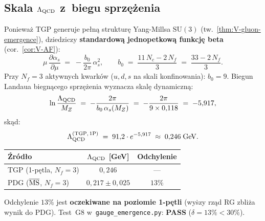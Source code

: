 \subsection{Skala $\Lambda_{\rm QCD}$ z~biegu sprz\k{e}\.zenia}%
\label{app:V-LambdaQCD}

\begin{proposition}%
\label{prop:V-LambdaQCD-RG}
Poniewa\.z TGP generuje pe\l{}n\k{a} struktur\k{e} Yang-Millsa
$\mathrm{SU}(3)$ (tw.~\ref{thm:V-gluon-emergence}), dziedziczy
\textbf{standardow\k{a} jednopetkow\k{a} funkcj\k{e} beta}
(cor.~\ref{cor:V-AF}):
\begin{equation}
  \mu\,\frac{\partial\alpha_s}{\partial\mu}
  \;=\; -\frac{b_0}{2\pi}\,\alpha_s^2,
  \qquad
  b_0 \;=\; \frac{11\,N_c - 2\,N_f}{3}
  \;=\; \frac{33 - 2\,N_f}{3}.
\end{equation}
Przy $N_f = 3$ aktywnych kwark\'ow ($u,d,s$ na skali konfinowania):
$b_0 = 9$.
Biegun Landaua biegn\k{a}cego sprz\k{e}\.zenia wyznacza skal\k{e}
dynamiczn\k{a}:
\begin{equation}\label{eq:V-LambdaQCD}
  \ln\frac{\Lambda_{\rm QCD}}{M_Z}
  \;=\; -\frac{2\pi}{b_0\,\alpha_s(M_Z)}
  \;=\; -\frac{2\pi}{9\times 0{,}118}
  \;=\; -5{,}917,
\end{equation}
sk\k{a}d:
\begin{equation}\label{eq:V-LambdaQCD-val}
  \Lambda_{\rm QCD}^{\rm (TGP,\,1P)}
  \;=\; 91{,}2 \cdot e^{-5{,}917}
  \;\approx\; 0{,}246\;\mathrm{GeV}.
\end{equation}

\begin{center}
\begin{tabular}{lcc}
\toprule
\'{Z}r\'od\l{}o & $\Lambda_{\rm QCD}$ [GeV] & Odchylenie \\
\midrule
TGP (1-p\k{e}tla, $N_f=3$) & $0{,}246$ & --- \\
PDG ($\overline{\rm MS}$, $N_f=3$) & $0{,}217 \pm 0{,}025$ & $13\%$ \\
\bottomrule
\end{tabular}
\end{center}

Odchylenie $13\%$ jest \textbf{oczekiwane na poziomie 1-p\k{e}tli}
(wy\.szy rz\k{a}d RG zbli\.za wynik do PDG).
Test~G8 w~\texttt{gauge\_emergence.py}: \textbf{PASS} ($\delta = 13\%
< 30\%$).


\end{proposition}
